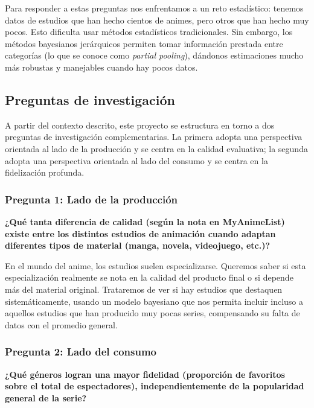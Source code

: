 \documentclass[
  spanish,
  11pt,
  letterpaper,
]{article}
\begin{document}
Para responder a estas preguntas nos enfrentamos a un reto estadístico:
tenemos datos de estudios que han hecho cientos de animes, pero otros
que han hecho muy pocos. Esto dificulta usar métodos estadísticos
tradicionales. Sin embargo, los métodos bayesianos jerárquicos permiten
tomar información prestada entre categorías (lo que se conoce como
\emph{partial pooling}), dándonos estimaciones mucho más robustas y
manejables cuando hay pocos datos.

\subsection{Preguntas de
investigación}\label{preguntas-de-investigaciuxf3n}

A partir del contexto descrito, este proyecto se estructura en torno a
dos preguntas de investigación complementarias. La primera adopta una
perspectiva orientada al lado de la producción y se centra en la calidad
evaluativa; la segunda adopta una perspectiva orientada al lado del
consumo y se centra en la fidelización profunda.

\subsubsection{Pregunta 1: Lado de la
producción}\label{pregunta-1-lado-de-la-producciuxf3n}

\textbf{¿Qué tanta diferencia de calidad (según la nota en MyAnimeList)
existe entre los distintos estudios de animación cuando adaptan
diferentes tipos de material (manga, novela, videojuego, etc.)?}

En el mundo del anime, los estudios suelen especializarse. Queremos
saber si esta especialización realmente se nota en la calidad del
producto final o si depende más del material original. Trataremos de ver
si hay estudios que destaquen sistemáticamente, usando un modelo
bayesiano que nos permita incluir incluso a aquellos estudios que han
producido muy pocas series, compensando su falta de datos con el
promedio general.

\subsubsection{Pregunta 2: Lado del
consumo}\label{pregunta-2-lado-del-consumo}

\textbf{¿Qué géneros logran una mayor fidelidad (proporción de favoritos
sobre el total de espectadores), independientemente de la popularidad
general de la serie?}
\end{document}
